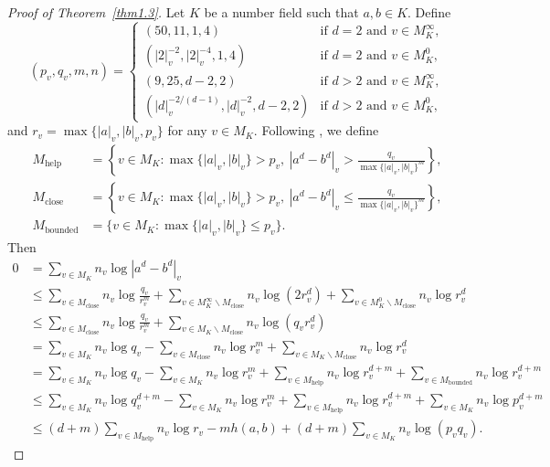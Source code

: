 \documentclass[10pt,a4paper]{amsart}
\numberwithin{equation}{section}
\theoremstyle{plain}
\theoremstyle{definition}
\theoremstyle{remark}
\newcommand{\bounded}{\mathrm{bounded}}
\newcommand{\close}{\mathrm{close}}
\newcommand{\help}{\mathrm{help}}
\begin{document}
\begin{proof}[Proof of Theorem~\ref{thm1.3}]
Let $K$ be a number field such
that $a,b\in K$. Define
\[
(p_{v},q_{v},m,n)=\begin{cases}
(50,11,1,4) & \text{if }d=2\text{ and }v\in M_{K}^{\infty},\\
\left(|2|_{v}^{-2},|2|_{v}^{-4},1,4\right) & \text{if }d=2\text{ and }v\in M_{K}^{0},\\
(9,25,d-2,2) & \text{if }d>2\text{ and }v\in M_{K}^{\infty},\\
\left(|d|_{v}^{-2/(d-1)},|d|_{v}^{-2},d-2,2\right) & \text{if }d>2\text{ and }v\in M_{K}^{0},
\end{cases}
\]
and $r_{v}=\max\{|a|_{v},|b|_{v},p_{v}\}$ for any $v\in M_{K}$.
Following \cite[Section 8.2]{DKY2}, we define
\begin{align*}
M_{\help} & =\left\{ v\in M_{K}:\max\{|a|_{v},|b|_{v}\}>p_{v},\ \left|a^{d}-b^{d}\right|_{v}>\frac{q_{v}}{\max\{|a|_{v},|b|_{v}\}^{m}}\right\} ,\\
M_{\close} & =\left\{ v\in M_{K}:\max\{|a|_{v},|b|_{v}\}>p_{v},\ \left|a^{d}-b^{d}\right|_{v}\leq\frac{q_{v}}{\max\{|a|_{v},|b|_{v}\}^{m}}\right\} ,\\
M_{\bounded} & =\{v\in M_{K}:\max\{|a|_{v},|b|_{v}\}\leq p_{v}\}.
\end{align*}
Then
\allowdisplaybreaks
\begin{align*}
0 & =\sum_{v\in M_{K}}n_{v}\log\left|a^{d}-b^{d}\right|_{v}\\
 & \leq\sum_{v\in M_{\close}}n_{v}\log\frac{q_{v}}{r_{v}^{m}}+\sum_{v\in M_{K}^{\infty}\backslash M_{\close}}n_{v}\log\left(2r_{v}^{d}\right)+\sum_{v\in M_{K}^{0}\backslash M_{\close}}n_{v}\log r_{v}^{d}\\
 & \leq\sum_{v\in M_{\close}}n_{v}\log\frac{q_{v}}{r_{v}^{m}}+\sum_{v\in M_{K}\backslash M_{\close}}n_{v}\log\left(q_{v}r_{v}^{d}\right)\\
 & =\sum_{v\in M_{K}}n_{v}\log q_{v}-\sum_{v\in M_{\close}}n_{v}\log r_{v}^{m}+\sum_{v\in M_{K}\backslash M_{\close}}n_{v}\log r_{v}^{d}\\
 & =\sum_{v\in M_{K}}n_{v}\log q_{v}-\sum_{v\in M_{K}}n_{v}\log r_{v}^{m}+\sum_{v\in M_{\help}}n_{v}\log r_{v}^{d+m}+\sum_{v\in M_{\bounded}}n_{v}\log r_{v}^{d+m}\\
 & \leq\sum_{v\in M_{K}}n_{v}\log q_{v}^{d+m}-\sum_{v\in M_{K}}n_{v}\log r_{v}^{m}+\sum_{v\in M_{\help}}n_{v}\log r_{v}^{d+m}+\sum_{v\in M_{K}}n_{v}\log p_{v}^{d+m}\\
 & \leq(d+m)\sum_{v\in M_{\help}}n_{v}\log r_{v}-mh(a,b)+(d+m)\sum_{v\in M_{K}}n_{v}\log(p_{v}q_{v}).

\end{align*}
\end{proof}
\end{document}
